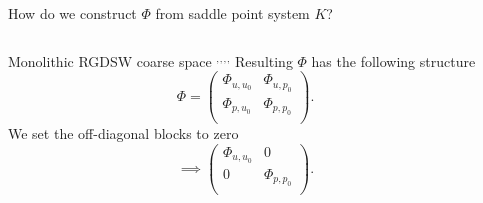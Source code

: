 \begin{frame}{How do we construct $\varPhi$ from saddle point system $K$?}
	\begin{columns}
		\begin{column}{0.52\textwidth}
			\vspace{-10mm}
			\begin{block}{\normalsize Monolithic RGDSW coarse space \footnotemark[1]$^,$\footnotemark[2]$^,$\footnotemark[3]$^,$\footnotemark[4]$^,$\footnotemark[5]}
				\vspace{2mm}
				Resulting $\varPhi$ has the following structure
				\begin{equation*}
					\varPhi = \begin{pmatrix}
						\varPhi_{u,u_0} & \varPhi_{u,p_0} \\
						\varPhi_{p,u_0} & \varPhi_{p,p_0} \\
					\end{pmatrix}.
				\end{equation*}
				\vspace{2mm}
				We set the off-diagonal blocks to zero
				\begin{equation*}
					\implies\begin{pmatrix}
						\varPhi_{u,u_0} & 0               \\
						0               & \varPhi_{p,p_0} \\
					\end{pmatrix}.
				\end{equation*}
				\vspace{9mm}
			\end{block}
		\end{column}
		\begin{column}{0.52\textwidth}
			\vspace{-10mm}
\end{column}
\end{columns}
\end{frame}
